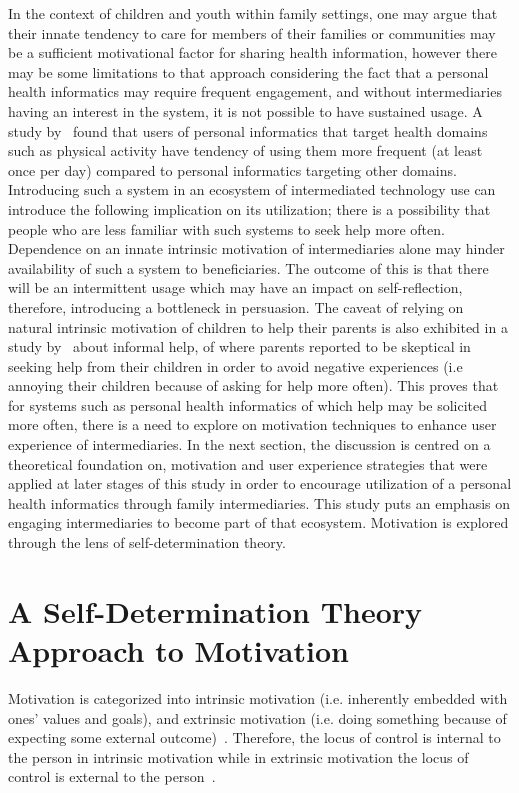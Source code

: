In the context of children and youth within family settings, one may argue that their innate tendency to care for members of their families or communities may be a sufficient motivational factor for sharing health information, however there may be some limitations to that approach considering the fact that a personal health informatics may require frequent engagement, and without intermediaries having an interest in the system, it is not possible to have sustained usage. A study by~\cite{epstein2015lived} found that users of personal informatics that target health domains such as physical activity have tendency of using them more frequent (at least once per day) compared to personal informatics targeting other domains. Introducing such a system in an ecosystem of intermediated technology use can introduce the following implication on its utilization; there is a possibility that people who are less familiar with such systems to seek help more often. Dependence on  an innate intrinsic motivation of intermediaries alone may hinder availability of such a system to beneficiaries. The outcome of this is that there will be an intermittent usage which may have an impact on self-reflection, therefore, introducing a bottleneck in persuasion. The caveat of relying on natural intrinsic motivation of children to help their parents is also exhibited in a study by~\cite{kiesler:twi} about informal help, of where parents reported  to be skeptical in seeking help from their children in order to avoid negative experiences (i.e annoying their children because of asking for help more often). This proves that for systems such as personal health informatics of which help may be solicited more often, there is a need to explore on motivation techniques to enhance user experience of intermediaries. In the next section, the discussion is centred on a theoretical foundation on, motivation and user experience strategies that were applied at later stages of this study in order to encourage utilization of a personal health informatics through family intermediaries. This study puts an emphasis on engaging intermediaries to become part of that ecosystem. Motivation is explored through the lens of self-determination theory.
\section{A Self-Determination Theory Approach to Motivation}
Motivation is categorized into intrinsic motivation (i.e. inherently embedded with ones' values and goals), and extrinsic motivation (i.e. doing something because of expecting some external outcome)~\citep{ryan2000intrinsic}. Therefore, the locus of control is internal to the person in intrinsic motivation while in extrinsic motivation the locus of control is external to the person~\citep{lee2015:relating}.

